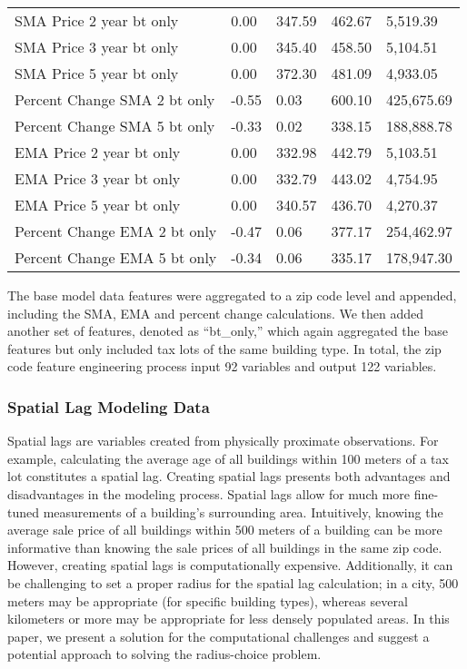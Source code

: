 \documentclass[12pt,]{article}
\begin{document}
\begin{table}
{\begin{tabular}[t]{lllll}
\addlinespace
SMA Price 2 year bt only & 0.00 & 347.59 & 462.67 & 5,519.39\\
SMA Price 3 year bt only & 0.00 & 345.40 & 458.50 & 5,104.51\\
SMA Price 5 year bt only & 0.00 & 372.30 & 481.09 & 4,933.05\\
Percent Change SMA 2 bt only & -0.55 & 0.03 & 600.10 & 425,675.69\\
Percent Change SMA 5 bt only & -0.33 & 0.02 & 338.15 & 188,888.78\\
\addlinespace
EMA Price 2 year bt only & 0.00 & 332.98 & 442.79 & 5,103.51\\
EMA Price 3 year bt only & 0.00 & 332.79 & 443.02 & 4,754.95\\
EMA Price 5 year bt only & 0.00 & 340.57 & 436.70 & 4,270.37\\
Percent Change EMA 2 bt only & -0.47 & 0.06 & 377.17 & 254,462.97\\
Percent Change EMA 5 bt only & -0.34 & 0.06 & 335.17 & 178,947.30\\
\bottomrule
\end{tabular}}
\end{table}

The base model data features were aggregated to a zip code level and
appended, including the SMA, EMA and percent change calculations. We
then added another set of features, denoted as ``bt\_only,'' which again
aggregated the base features but only included tax lots of the same
building type. In total, the zip code feature engineering process input
92 variables and output 122 variables.

\hypertarget{spatial-lag-modeling-data}{%
\subsubsection{Spatial Lag Modeling
Data}\label{spatial-lag-modeling-data}}

Spatial lags are variables created from physically proximate
observations. For example, calculating the average age of all buildings
within 100 meters of a tax lot constitutes a spatial lag. Creating
spatial lags presents both advantages and disadvantages in the modeling
process. Spatial lags allow for much more fine-tuned measurements of a
building's surrounding area. Intuitively, knowing the average sale price
of all buildings within 500 meters of a building can be more informative
than knowing the sale prices of all buildings in the same zip code.
However, creating spatial lags is computationally expensive.
Additionally, it can be challenging to set a proper radius for the
spatial lag calculation; in a city, 500 meters may be appropriate (for
specific building types), whereas several kilometers or more may be
appropriate for less densely populated areas. In this paper, we present
a solution for the computational challenges and suggest a potential
approach to solving the radius-choice problem.
\end{document}
